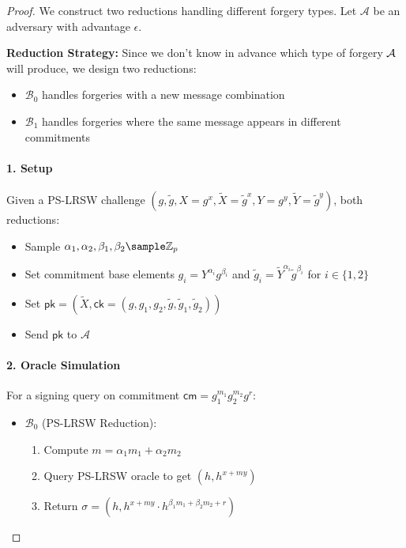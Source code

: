 \begin{proof}
We construct two reductions handling different forgery types. Let $\mathcal{A}$ be an adversary with advantage $\epsilon$.

\textbf{Reduction Strategy: } Since we don't know in advance which type of forgery $\mathcal{A}$ will produce, we design two reductions:
\begin{itemize}
    \item $\mathcal{B}_0$ handles forgeries with a new message combination
    \item $\mathcal{B}_1$ handles forgeries where the same message appears in different commitments
\end{itemize}

\paragraph{1. Setup}
Given a PS-LRSW challenge $(g, \tilde{g}, X=g^x, \tilde{X}=\tilde{g}^x, Y=g^y, \tilde{Y}=\tilde{g}^y)$, both reductions:
\begin{itemize}
    \item Sample $\alpha_1, \alpha_2, \beta_1, \beta_2 \sample \Z_p$ 
    \item Set commitment base elements $g_i = Y^{\alpha_i}g^{\beta_i}$ and $\tilde{g}_i = \tilde{Y}^{\alpha_i}\tilde{g}^{\beta_i}$ for $i \in \{1,2\}$
    \item Set $\mathsf{pk} = (\tilde{X}, \mathsf{ck} = (g, g_1, g_2, \tilde{g}, \tilde{g}_1, \tilde{g}_2))$
    \item Send $\mathsf{pk}$ to $\mathcal{A}$
\end{itemize}

\paragraph{2. Oracle Simulation}
For a signing query on commitment $\mathsf{cm} = g_1^{m_1}g_2^{m_2}g^r$:
\begin{itemize}
    \item $\mathcal{B}_0$ (PS-LRSW Reduction):
    \begin{enumerate}
        \item Compute $m = \alpha_1m_1 + \alpha_2m_2$ 
        \item Query PS-LRSW oracle to get $(h, h^{x+my})$
        \item Return $\sigma = (h, h^{x+my} \cdot h^{\beta_1m_1 + \beta_2m_2 + r})$
    \end{enumerate}
    

\end{itemize}
\end{proof}
